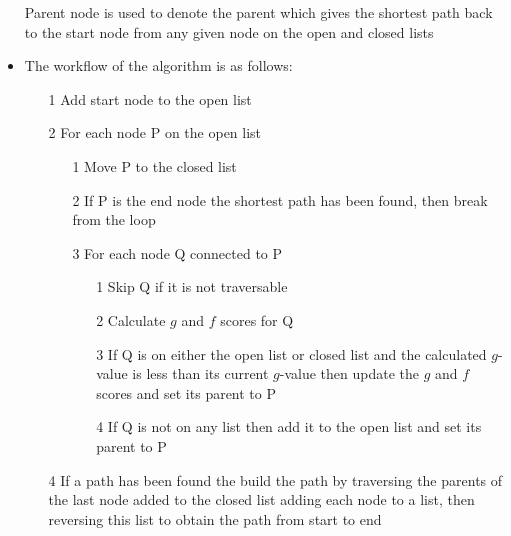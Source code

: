 \documentclass[a4paper]{article}
\begin{document}
\begin{itemize}
    Parent node is used to denote the parent which gives the shortest path back
    to the start node from any given node on the open and closed lists

  \item
    The workflow of the algorithm is as follows:
    \begin{enumerate}
      \item[1]
        Add start node to the open list

      \item[2]
        For each node P on the open list

        \begin{enumerate}
          \item[1]
            Move P to the closed list

          \item[2]
            If P is the end node the shortest path has been found, then break
            from the loop

          \item[3]
            For each node Q connected to P

          \begin{enumerate}
            \item[1]
              Skip Q if it is not traversable

            \item[2]
              Calculate $g$ and $f$ scores for Q

            \item[3]
              If Q is on either the open list or closed list and the calculated
              $g$-value is less than its current $g$-value then update the $g$
              and $f$ scores and set its parent to P

            \item[4]
              If Q is not on any list then add it to the open list and set its
              parent to P

          \end{enumerate}

        \end{enumerate}

      \item[4]
        If a path has been found the build the path by traversing the parents of
        the last node added to the closed list adding each node to a list, then
        reversing this list to obtain the path from start to end

    \end{enumerate}

\end{itemize}
\end{document}
